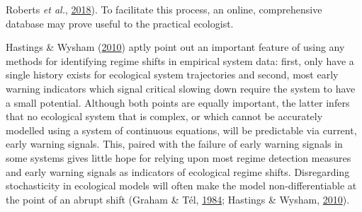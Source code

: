 \documentclass[12pt,twoside,openany]{reedthesis}
\begin{document}
Roberts \emph{et al.}, \protect\hyperlink{ref-roberts2018early}{2018}). To facilitate this process, an online, comprehensive database may prove useful to the practical ecologist.

Hastings \& Wysham (\protect\hyperlink{ref-hastings2010regime}{2010}) aptly point out an important feature of using any methods for identifying regime shifts in empirical system data: first, only have a single history exists for ecological system trajectories and second, most early warning indicators which signal critical slowing down require the system to have a small potential. Although both points are equally important, the latter infers that no ecological system that is complex, or which cannot be accurately modelled using a system of continuous equations, will be predictable via current, early warning signals. This, paired with the failure of early warning signals in some systems gives little hope for relying upon most regime detection measures and early warning signals as indicators of ecological regime shifts. Disregarding stochasticity in ecological models will often make the model non-differentiable at the point of an abrupt shift (Graham \& Tél, \protect\hyperlink{ref-graham1984existence}{1984}; Hastings \& Wysham, \protect\hyperlink{ref-hastings2010regime}{2010}).
\end{document}

